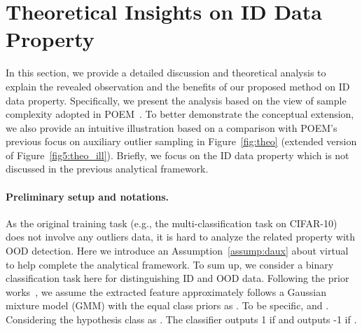 \documentclass{article}
\theoremstyle{plain}
\theoremstyle{definition}
\theoremstyle{remark}
\begin{document}
\section{Theoretical Insights on ID Data Property}
\label{app:theo}

In this section, we provide a detailed discussion and theoretical analysis to explain the revealed observation and the benefits of our proposed method on ID data property. Specifically, we present the analysis based on the view of sample complexity adopted in POEM~\citep{ming2022poem}. To better demonstrate the conceptual extension, we also provide an intuitive illustration based on a comparison with POEM's previous focus on auxiliary outlier sampling in Figure~\ref{fig:theo} (extended version of Figure~\ref{fig5:theo_ill}). Briefly, we focus on the ID data property which is not discussed in the previous analytical framework.

\paragraph{Preliminary setup and notations.} As the original training task (e.g., the multi-classification task on CIFAR-10) does not involve any outliers data, it is hard to analyze the related property with OOD detection. Here we introduce an Assumption~\ref{assump:daux} about virtual  to help complete the analytical framework. 
To sum up, we consider a binary classification task here for distinguishing ID and OOD data. Following the prior works~\citep{LeeLLS18,SehwagCM21,ming2022poem}, we assume the extracted feature approximately follows a Gaussian mixture model (GMM) with the equal class priors as . To be specific,   and . Considering the hypothesis class as . The classifier outputs 1 if  and outputs -1 if .
\end{document}

